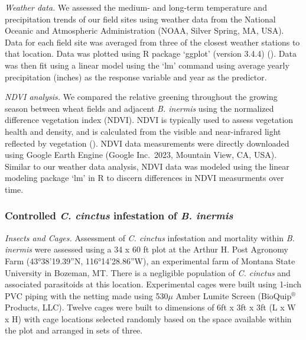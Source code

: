 \documentclass[
]{article}
\begin{document}
\emph{Weather data.} We assessed the medium- and long-term temperature
and precipitation trends of our field sites using weather data from the
National Oceanic and Atmospheric Administration (NOAA, Silver Spring,
MA, USA). Data for each field site was averaged from three of the
closest weather stations to that location. Data was plotted using R
package `ggplot' (version 3.4.4) ().
Data was then fit using a linear model using the `lm' command using
average yearly precipitation (inches) as the response variable and year
as the predictor.

\emph{NDVI analysis.} We compared the relative greening throughout the
growing season between wheat fields and adjacent \emph{B. inermis} using
the normalized difference vegetation index (NDVI). NDVI is typically
used to assess vegetation health and density, and is calculated from the
visible and near-infrared light reflected by vegetation
(). NDVI data
measurements were directly downloaded using Google Earth Engine (Google
Inc.~2023, Mountain View, CA, USA). Similar to our weather data
analysis, NDVI data was modeled using the linear modeling package `lm'
in R to discern differences in NDVI measurments over time.

\subsubsection{\texorpdfstring{Controlled \emph{C. cinctus} infestation
of \emph{B.
inermis}}{Controlled C. cinctus infestation of B. inermis}}\label{controlled-c.-cinctus-infestation-of-b.-inermis}

\emph{Insects and Cages.} Assessment of \emph{C. cinctus} infestation
and mortality within \emph{B. inermis} were assessed using a 34 x 60 ft
plot at the Arthur H. Post Agronomy Farm (43°38'19.39''N,
116°14'28.86''W), an experimental farm of Montana State University in
Bozeman, MT. There is a negligible population of \emph{C. cinctus} and
associated parasitoids at this location. Experimental cages were built
using 1-inch PVC piping with the netting made using 530\(\mu\) Amber
Lumite Screen (BioQuip\(^\circledR\) Products, LLC). Twelve cages were
built to dimensions of 6ft x 3ft x 3ft (L x W x H) with cage locations
selected randomly based on the space available within the plot and
arranged in sets of three.
\end{document}
